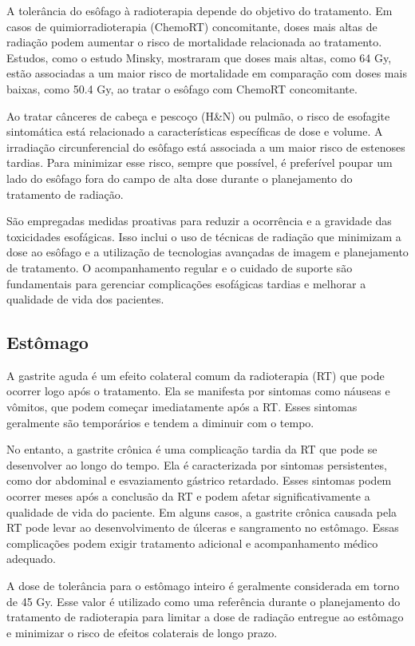 \documentclass[11pt,a4paper]{article}
\begin{document}
	A tolerância do esôfago à radioterapia depende do objetivo do tratamento. Em casos de quimiorradioterapia (ChemoRT) concomitante, doses mais altas de radiação podem aumentar o risco de mortalidade relacionada ao tratamento. Estudos, como o estudo Minsky, mostraram que doses mais altas, como 64 Gy, estão associadas a um maior risco de mortalidade em comparação com doses mais baixas, como 50.4 Gy, ao tratar o esôfago com ChemoRT concomitante.

	Ao tratar cânceres de cabeça e pescoço (H\&N) ou pulmão, o risco de esofagite sintomática está relacionado a características específicas de dose e volume. A irradiação circunferencial do esôfago está associada a um maior risco de estenoses tardias. Para minimizar esse risco, sempre que possível, é preferível poupar um lado do esôfago fora do campo de alta dose durante o planejamento do tratamento de radiação.

	São empregadas medidas proativas para reduzir a ocorrência e a gravidade das toxicidades esofágicas. Isso inclui o uso de técnicas de radiação que minimizam a dose ao esôfago e a utilização de tecnologias avançadas de imagem e planejamento de tratamento. O acompanhamento regular e o cuidado de suporte são fundamentais para gerenciar complicações esofágicas tardias e melhorar a qualidade de vida dos pacientes.

\subsection*{Estômago}

	A gastrite aguda é um efeito colateral comum da radioterapia (RT) que pode ocorrer logo após o tratamento. Ela se manifesta por sintomas como náuseas e vômitos, que podem começar imediatamente após a RT. Esses sintomas geralmente são temporários e tendem a diminuir com o tempo.

	No entanto, a gastrite crônica é uma complicação tardia da RT que pode se desenvolver ao longo do tempo. Ela é caracterizada por sintomas persistentes, como dor abdominal e esvaziamento gástrico retardado. Esses sintomas podem ocorrer meses após a conclusão da RT e podem afetar significativamente a qualidade de vida do paciente. Em alguns casos, a gastrite crônica causada pela RT pode levar ao desenvolvimento de úlceras e sangramento no estômago. Essas complicações podem exigir tratamento adicional e acompanhamento médico adequado.

	A dose de tolerância para o estômago inteiro é geralmente considerada em torno de 45 Gy. Esse valor é utilizado como uma referência durante o planejamento do tratamento de radioterapia para limitar a dose de radiação entregue ao estômago e minimizar o risco de efeitos colaterais de longo prazo.
\end{document}
